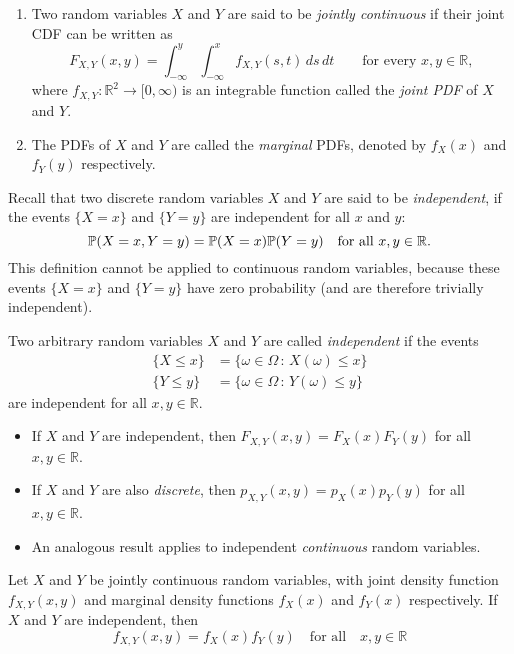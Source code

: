 \documentclass[lecture]{csm}
\newcommand{\prob}{\mathbb{P}}
\newcommand{\R}{\mathbb{R}}
\def\it{\item}
\def\bit{\begin{itemize}}
\def\eit{\end{itemize}}
\def\ben{\begin{enumerate}}
\def\een{\end{enumerate}}
\newcommand{\proofomitted}{\par[\textit{Proof omitted.}]\par}
\begin{document}
\begin{definition}
\ben
\it Two random variables $X$ and $Y$ are said to be \emph{jointly continuous} if their joint CDF can be written as
\[
F_{X,Y}(x,y) = \int_{-\infty}^y\int_{-\infty}^x f_{X,Y}(s,t)\,ds\,dt\qquad\text{for every }x,y\in\R,
\]
where $f_{X,Y}:\R^2\to[0,\infty)$ is an integrable function called the \emph{joint PDF} of $X$ and $Y$.
\it The PDFs of $X$ and $Y$ are called the \emph{marginal} PDFs, denoted by $f_X(x)$ and $f_Y(y)$ respectively.
\een
\end{definition}

\newpage

Recall that two discrete random variables $X$ and $Y$ are said to be \emph{independent}, if the events $\{X=x\}$ and $\{Y=y\}$ are independent for all $x$ and $y$:
\[
\prob(X=x,Y=y) = \prob(X=x)\prob(Y=y) \text{\quad for all }x,y\in\R.
\]
This definition cannot be applied to continuous random variables, because these events  $\{X=x\}$ and $\{Y=y\}$ have zero probability (and are therefore trivially independent).

\begin{definition}
Two arbitrary random variables $X$ and $Y$ are called \emph{independent} if the events
\begin{align*}
\{X \leq x\} & = \{\omega\in\Omega\,:\, X(\omega) \leq x\} \\
\{Y \leq y\} & = \{\omega\in\Omega\,:\, Y(\omega) \leq y\}
\end{align*}
are independent for all $x,y\in\R$. 
\end{definition}

\bit
\it If $X$ and $Y$ are independent, then $F_{X,Y}(x,y) = F_X(x)F_Y(y)$ for all $x,y\in\R$.
\it If $X$ and $Y$ are also \emph{discrete}, then $p_{X,Y}(x,y)=p_X(x)p_Y(y)$ for all $x,y\in\R$.
\it An analogous result applies to independent \emph{continuous} random variables.
\eit

\newpage

\begin{lemma}\label{thm:product_marginal_pdfs}
Let $X$ and $Y$ be jointly continuous random variables, with joint density function $f_{X,Y}(x,y)$ and marginal density functions $f_X(x)$ and $f_Y(x)$ respectively. If $X$ and $Y$ are independent, then
\[
f_{X,Y}(x,y) = f_X(x)f_Y(y) \quad\text{for all}\quad x,y\in\R
\]
\end{lemma}
\proofomitted
\end{document}
